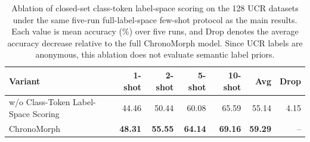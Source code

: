 \begin{table}[t]
\centering
\caption{Ablation of closed-set class-token label-space scoring on the 128 UCR datasets under the same five-run full-label-space few-shot protocol as the main results. Each value is mean accuracy (\%) over five runs, and Drop denotes the average accuracy decrease relative to the full ChronoMorph model. Since UCR labels are anonymous, this ablation does not evaluate semantic label priors.}
\label{tab:ablation-decoding}
\begin{tabular}{lrrrrrr}
\toprule
Variant & 1-shot & 2-shot & 5-shot & 10-shot & Avg & Drop \\
\midrule
w/o Class-Token Label-Space Scoring & 44.46 & 50.44 & 60.08 & 65.59 & 55.14 & 4.15 \\
ChronoMorph & \textbf{48.31} & \textbf{55.55} & \textbf{64.14} & \textbf{69.16} & \textbf{59.29} & -- \\
\bottomrule
\end{tabular}
\end{table}
